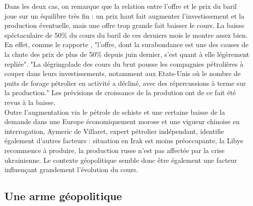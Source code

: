 \medskip
Dans les deux cas, on remarque que la relation entre l’offre et le prix du baril joue sur un équilibre très fin : un prix haut fait augmenter l’investissement et la production éventuelle, mais une offre trop grande fait baisser le cours. La baisse spéctaculaire de 50\% du cours du baril de ces derniers mois le montre assez bien. En effet, comme le rapporte \cite{rvnuAIENnO}, "l’offre, dont la surabondance est une des causes de la chute des prix de plus de 50\% depuis juin dernier, s’est quant à elle légèrement repliée". "La dégringolade des cours du brut pousse les compagnies pétrolières à couper dans leurs investissements, notamment aux Etats-Unis où le nombre de puits de forage pétrolier en activité a décliné, avec des répercussions à terme sur la production." Les prévisions de croissance de la prodution ont de ce fait été revus à la baisse.\\
Outre l’augmentation via le pétrole de schiste et une certaine baisse de la demande dans une Europe économiquement morose et une vigueur chinoise en interrogation, Aymeric de Villaret, expert pétrolier indépendant, identifie également d’autres facteurs : situation en Irak est moins préoccupante, la Libye recommence à produire, la production russe n’est pas affectée par la crise ukrainienne.\cite{ArabCleJeu} Le contexte géopolitique semble donc être également une facteur influençant grandement l’évolution du cours.

\subsection{Une arme géopolitique}
